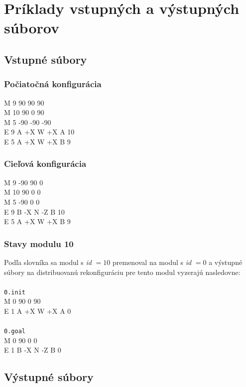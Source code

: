 \documentclass[
  digital, %
  oneside, %
  notable,   %
  lof,     %
  nolot,     %
]{fithesis3}
\begin{document}

\cleardoublepage
\appendix
\chapter{Príklady vstupných a výstupných súborov}
\label{sec:inOutFiles}
\section{Vstupné súbory}
\subsection{Počiatočná konfigurácia}
M 9 90 90 90 \\
M 10 90 0 90 \\
M 5 -90 -90 -90 \\
E 9 A +X W +X A 10 \\
E 5 A +X W +X B 9

\subsection{Cieľová konfigurácia}
M 9 -90 90 0 \\
M 10 90 0 0 \\
M 5 -90 0 0 \\
E 9 B -X N -Z B 10 \\
E 5 A +X W +X B 9

\subsection{Stavy modulu 10}
\label{sec:algoInput}
Podľa slovníka sa modul s \textit{id} $= 10$ premenoval na modul s \textit{id} $= 0$ a výstupné súbory na distribuovanú rekonfiguráciu pre tento modul vyzerajú nasledovne: \\ \\
\texttt{0.init} \\
M 0 90 0 90 \\
E 1 A +X W +X A 0 \\
\\
\texttt{0.goal} \\
M 0 90 0 0 \\
E 1 B -X N -Z B 0 \\

\section{Výstupné súbory}
\end{document}
